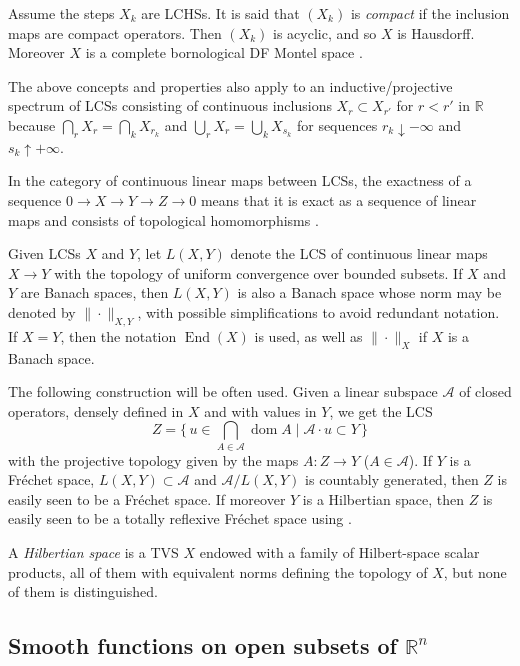\documentclass{memo-l}
\theoremstyle{plain}
\theoremstyle{definition}
\theoremstyle{remark}
\newcommand{\R}{\mathbb{R}}
\renewcommand{\AA}{\mathcal{A}}
\newcommand{\End}{\operatorname{End}}
\newcommand{\dom}{\operatorname{dom}}
\numberwithin{section}{chapter}
\numberwithin{equation}{section}%
\begin{document}
Assume the steps $X_k$ are LCHSs. It is said that $(X_k)$ is \emph{compact} if the inclusion maps are compact operators. Then $(X_k)$ is acyclic, and so $X$ is Hausdorff. Moreover $X$ is a complete bornological DF Montel space \cite[Theorem~6']{Komatsu1967}.

The above concepts and properties also apply to an inductive/projective spectrum of LCSs consisting of continuous inclusions $X_r\subset X_{r'}$ for $r<r'$ in $\R$ because $\bigcap_rX_r=\bigcap_kX_{r_k}$ and $\bigcup_rX_r=\bigcup_kX_{s_k}$ for sequences $r_k\downarrow-\infty$ and $s_k\uparrow+\infty$.

In the category of continuous linear maps between LCSs, the exactness of a sequence $0\to X \to Y \to Z\to0$ means that it is exact as a sequence of linear maps and consists of topological homomorphisms \cite[Sections~2.1 and~2.2]{Wengenroth2003}.

Given LCSs $X$ and $Y$, let $L(X,Y)$  denote the LCS of continuous linear maps $X\to Y$ with the topology of uniform convergence over bounded subsets. If $X$ and $Y$ are Banach spaces, then $L(X,Y)$ is also a Banach space whose norm may be denoted by $\|{\cdot}\|_{X,Y}$, with possible simplifications to avoid redundant notation. If $X=Y$, then the notation $\End(X)$ \index{$\End(X)$} is used, as well as $\|{\cdot}\|_X$ if $X$ is a Banach space. 

The following construction will be often used. Given a linear subspace $\AA$ of closed operators, densely defined in $X$ and with values in $Y$, we get the LCS
\begin{equation}\label{Z = u in bigcup_A in AA dom A | AA cdot u subset Y}
Z=\Big\{\,u\in\bigcap_{A\in\AA}\dom A\mid \AA\cdot u\subset Y\,\Big\}
\end{equation}
with the projective topology given by the maps $A:Z\to Y$ ($A\in\AA$).  If $Y$ is a Fr\'echet space, $L(X,Y)\subset\AA$ and $\AA/L(X,Y)$ is countably generated, then $Z$ is easily seen to be a Fr\'echet space. If moreover $Y$ is a Hilbertian space, then $Z$ is easily seen to be a totally reflexive Fr\'echet space using \cite[Theorem~4]{Valdivia1989}.

A \emph{Hilbertian space}  is a TVS $X$ endowed with a family of Hilbert-space scalar products, all of them with equivalent norms defining the topology of $X$, but none of them is distinguished.


\subsection{Smooth functions on open subsets of $\R^n$}\label{ss: smooth functions on U}
\end{document}
